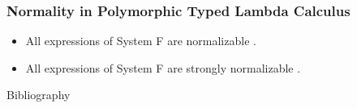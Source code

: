 \begin{frame}[fragile]
    \frametitle{Normality in Polymorphic Typed Lambda Calculus}
  
    \begin{itemize}
        \item All expressions of System F are normalizable \cite{girard1972phd}.
        \item All expressions of System F are strongly normalizable \cite{PRAWITZ1971235}.
    \end{itemize}
\end{frame}


\begin{frame}{Bibliography}


\end{frame}


